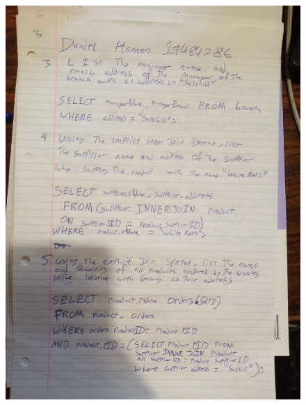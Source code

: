 \documentclass{article}
\begin{document}
	\begin{figure}
		\centering
		\includegraphics[width=\textwidth]{IMG_20210113_113123}
	\end{figure}
	\newpage
\end{document}
